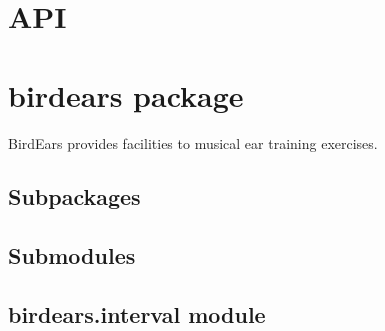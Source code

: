 \documentclass[letterpaper,10pt,english]{sphinxmanual}
\begin{document}
\chapter{API}
\label{\detokenize{index:api}}

\chapter{birdears package}
\label{\detokenize{index:module-birdears}}\label{\detokenize{index:birdears-package}}
BirdEars provides facilities to musical ear training exercises.


\section{Subpackages}
\label{\detokenize{index:subpackages}}

\section{Submodules}
\label{\detokenize{index:submodules}}

\section{birdears.interval module}
\label{\detokenize{index:module-birdears.interval}}\label{\detokenize{index:birdears-interval-module}}
\end{document}
